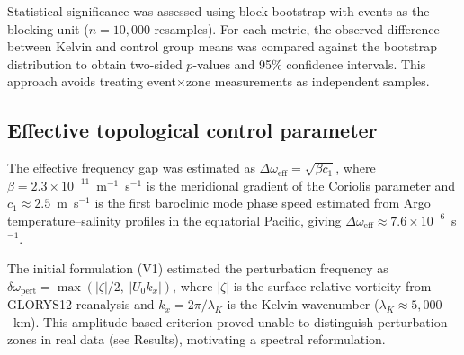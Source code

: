 \documentclass[11pt]{article}
\begin{document}
Statistical significance was assessed using block bootstrap with events as the blocking unit ($n = 10{,}000$ resamples). For each metric, the observed difference between Kelvin and control group means was compared against the bootstrap distribution to obtain two-sided $p$-values and 95\% confidence intervals. This approach avoids treating event$\times$zone measurements as independent samples.

\subsection{Effective topological control parameter}

The effective frequency gap was estimated as $\Delta\omega_\mathrm{eff} = \sqrt{\beta c_1}$, where $\beta = 2.3 \times 10^{-11}$~m$^{-1}$~s$^{-1}$ is the meridional gradient of the Coriolis parameter and $c_1 \approx 2.5$~m~s$^{-1}$ is the first baroclinic mode phase speed estimated from Argo temperature--salinity profiles\cite{Roemmich2009} in the equatorial Pacific, giving $\Delta\omega_\mathrm{eff} \approx 7.6 \times 10^{-6}$~s$^{-1}$.

The initial formulation (V1) estimated the perturbation frequency as $\delta\omega_\mathrm{pert} = \max(|\zeta|/2,\ |U_0 k_x|)$, where $|\zeta|$ is the surface relative vorticity from GLORYS12 reanalysis and $k_x = 2\pi / \lambda_K$ is the Kelvin wavenumber ($\lambda_K \approx 5{,}000$~km). This amplitude-based criterion proved unable to distinguish perturbation zones in real data (see Results), motivating a spectral reformulation.
\end{document}
